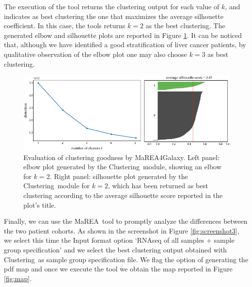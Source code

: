 \documentclass[preprint,12pt,authoryear]{elsarticle}
\newcommand{\mareagalaxy}{\textsf{MaREA4Galaxy}}
\newcommand{\mareaTool}{\textsf{MaREA}}
\newcommand{\clusterTool}{\textsf{Clustering}}
\begin{document}
The execution of the tool returns the clustering output for each value
of $k$, and indicates as best clustering the one that maximizes the
average silhouette coefficient.
%
In this case, the tools returns $k=2$ as the best clustering. The
generated elbow and silhouette plots are reported in Figure
\ref{fig:goodness}. It can be noticed that, although we have
identified a good stratification of liver cancer patients, by
qualitative observation of the elbow plot one may also choose $k=3$ as
best clustering.

\begin{figure}[ht]
  \includegraphics[width=1\textwidth]{figs/goodness.png}
  \caption{Evaluation of clustering goodness by \mareagalaxy. Left
    panel: elbow plot generated by the \clusterTool\ module, showing
    an elbow for $k=2$. Right panel: silhouette plot generated by the
    \clusterTool\ module for $k=2$, which has been returned as best
    clustering according to the average silhouette score reported in
    the plot's title.}
  \label{fig:goodness}
\end{figure}

Finally, we can use the \mareaTool\ tool to promptly analyze the
differences between the two patient cohorts. As shown in the
screenshot in Figure \ref{fig:screenshot3}, we select this time the
Input format option `RNAseq of all samples + sample group
specification' and we select the best clustering output obtained with
\clusterTool\ as sample group specification file. We flag the option
of generating the pdf map and once we execute the tool we obtain the
map reported in Figure \ref{fig:map}.
\end{document}
